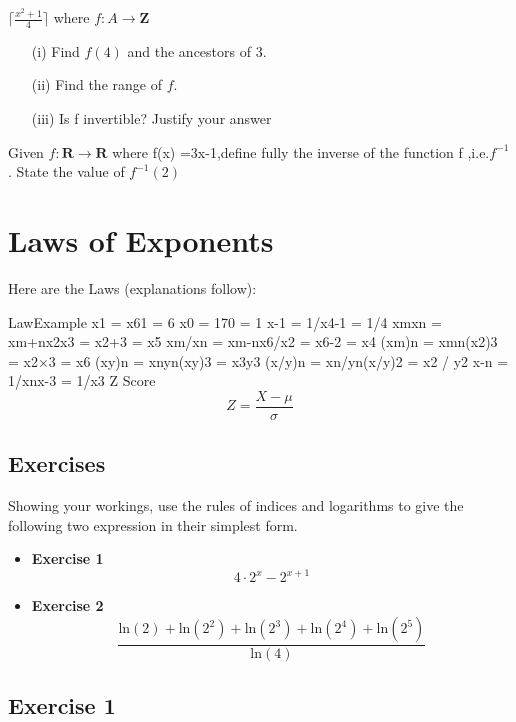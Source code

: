 \documentclass[]{report}
\begin{document}
$\lceil \frac{x^2+1}{4} \rceil$
where $f : A \rightarrow \textbf{Z}$
\begin{itemize}
\item[(i)] Find $f(4)$ and the ancestors of 3.
\item[(ii)] Find the range of $f$.
\item[(iii)] Is f invertible? Justify your answer
\end{itemize}

Given $f : \textbf{R} \rightarrow \textbf{R}$ where f(x) =3x-1,define fully
the inverse of the function f ,i.e.$f^{-1}$. 
State the value of $f^{-1}(2)$



\section{Laws of Exponents}
Here are the Laws (explanations follow):

LawExample
x1 = x61 = 6
x0 = 170 = 1
x-1 = 1/x4-1 = 1/4
xmxn = xm+nx2x3 = x2+3 = x5
xm/xn = xm-nx6/x2 = x6-2 = x4
(xm)n = xmn(x2)3 = x2×3 = x6
(xy)n = xnyn(xy)3 = x3y3
(x/y)n = xn/yn(x/y)2 = x2 / y2
x-n = 1/xnx-3 = 1/x3
Z Score
\[ Z = \frac{X - \mu}{\sigma} \]






\subsection{Exercises}

Showing your workings, use the rules of indices and logarithms to give the following two expression in their simplest form.
\bigskip
\begin{itemize}
\item \textbf{Exercise 1}
\[ 4 \cdot 2^x - 2^{x+1} \]
\item \textbf{Exercise 2}
\[  \frac{\mbox{ln}(2) + \mbox{ln}(2^2) + \mbox{ln}(2^3)  + \mbox{ln}(2^4) + \mbox{ln}(2^5)  }  {\mbox{ln}(4)}  \]
\end{itemize}

\subsection{Exercise 1}
\end{document}
